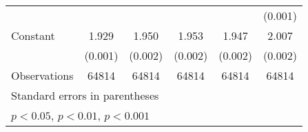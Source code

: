 {\begin{tabular}{l*{5}{c}}
                    &                     &                     &                     &                     &     (0.001)         \\
[1em]
Constant            &       1.929\sym{***}&       1.950\sym{***}&       1.953\sym{***}&       1.947\sym{***}&       2.007\sym{***}\\
                    &     (0.001)         &     (0.002)         &     (0.002)         &     (0.002)         &     (0.002)         \\
\hline
Observations        &       64814         &       64814         &       64814         &       64814         &       64814         \\
\hline\hline
\multicolumn{6}{l}{\footnotesize Standard errors in parentheses}\\
\multicolumn{6}{l}{\footnotesize \sym{*} \(p<0.05\), \sym{**} \(p<0.01\), \sym{***} \(p<0.001\)}\\
\end{tabular}
}
